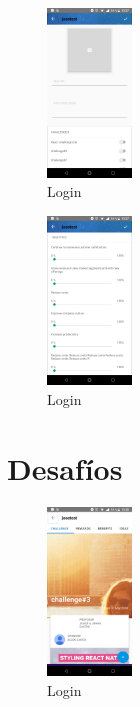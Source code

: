\begin{figure}[!h]
	\begin{center}
		\includegraphics[width=0.2\textwidth]{./img/anexo1/crear_idea.png}
		\caption{Login}
		\label{fig:crear_idea}
	\end{center}
\end{figure}

\begin{figure}[!h]
	\begin{center}
		\includegraphics[width=0.2\textwidth]{./img/anexo1/crear_idea_cont.png}
		\caption{Login}
		\label{fig:crear_idea_cont}
	\end{center}
\end{figure}

\section{Desafíos}

\begin{figure}[!h]
	\begin{center}
		\includegraphics[width=0.2\textwidth]{./img/anexo1/ver_desafio_inicio.png}
		\caption{Login}
		\label{fig:ver_desafio_inicio}
	\end{center}
\end{figure}


